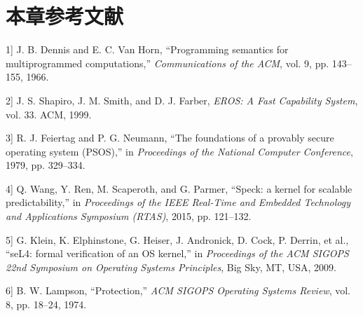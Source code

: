 \section{本章参考文献}\label{sec:2-chapter-bibliography}

\protect{}\label{cite:2-1}

\noindent {[}1{]} J. B. Dennis and E. C. Van Horn, ``Programming semantics for multiprogrammed computations,'' \textit{Communications of the ACM}, vol. 9, pp. 143--155, 1966.

\protect{}\label{cite:2-2}

\noindent {[}2{]} J. S. Shapiro, J. M. Smith, and D. J. Farber, \textit{EROS: A Fast Capability System}, vol. 33. ACM, 1999.

\protect{}\label{cite:2-3}

\noindent {[}3{]} R. J. Feiertag and P. G. Neumann, ``The foundations of a provably secure operating system (PSOS),'' in \textit{Proceedings of the National Computer Conference}, 1979, pp. 329--334.

\protect{}\label{cite:2-4}

\noindent {[}4{]} Q. Wang, Y. Ren, M. Scaperoth, and G. Parmer, ``Speck: a kernel for scalable predictability,'' in \textit{Proceedings of the IEEE Real-Time and Embedded Technology and Applications Symposium (RTAS)}, 2015, pp. 121--132.

\protect{}\label{cite:2-5}

\noindent {[}5{]} G. Klein, K. Elphinstone, G. Heiser, J. Andronick, D. Cock, P. Derrin, et al., ``seL4: formal verification of an OS kernel,'' in \textit{Proceedings of the ACM SIGOPS 22nd Symposium on Operating Systems Principles}, Big Sky, MT, USA, 2009.

\protect{}\label{cite:2-6}

\noindent {[}6{]} B. W. Lampson, ``Protection,'' \textit{ACM SIGOPS Operating Systems Review}, vol. 8, pp. 18--24, 1974.

